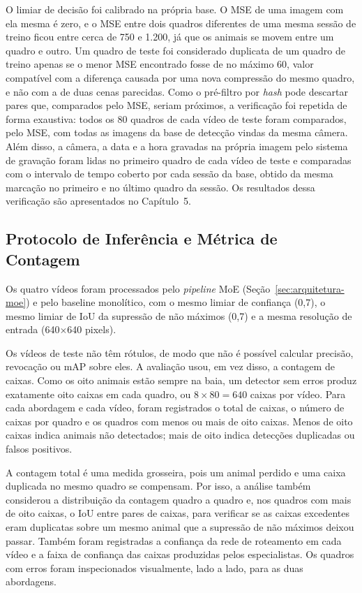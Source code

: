 O limiar de decisão foi calibrado na própria base. O MSE de uma imagem com ela mesma é zero, e o MSE entre dois quadros diferentes de uma mesma sessão de treino ficou entre cerca de 750 e 1.200, já que os animais se movem entre um quadro e outro. Um quadro de teste foi considerado duplicata de um quadro de treino apenas se o menor MSE encontrado fosse de no máximo 60, valor compatível com a diferença causada por uma nova compressão do mesmo quadro, e não com a de duas cenas parecidas. Como o pré-filtro por \textit{hash} pode descartar pares que, comparados pelo MSE, seriam próximos, a verificação foi repetida de forma exaustiva: todos os 80 quadros de cada vídeo de teste foram comparados, pelo MSE, com todas as imagens da base de detecção vindas da mesma câmera. Além disso, a câmera, a data e a hora gravadas na própria imagem pelo sistema de gravação foram lidas no primeiro quadro de cada vídeo de teste e comparadas com o intervalo de tempo coberto por cada sessão da base, obtido da mesma marcação no primeiro e no último quadro da sessão. Os resultados dessa verificação são apresentados no Capítulo~5.

\subsection{Protocolo de Inferência e Métrica de Contagem}
\label{subsec:metrica-contagem}

Os quatro vídeos foram processados pelo \textit{pipeline} MoE (Seção~\ref{sec:arquitetura-moe}) e pelo baseline monolítico, com o mesmo limiar de confiança (0,7), o mesmo limiar de IoU da supressão de não máximos (0,7) e a mesma resolução de entrada (640$\times$640 pixels).

Os vídeos de teste não têm rótulos, de modo que não é possível calcular precisão, revocação ou mAP sobre eles. A avaliação usou, em vez disso, a contagem de caixas. Como os oito animais estão sempre na baia, um detector sem erros produz exatamente oito caixas em cada quadro, ou $8 \times 80 = 640$ caixas por vídeo. Para cada abordagem e cada vídeo, foram registrados o total de caixas, o número de caixas por quadro e os quadros com menos ou mais de oito caixas. Menos de oito caixas indica animais não detectados; mais de oito indica detecções duplicadas ou falsos positivos.

A contagem total é uma medida grosseira, pois um animal perdido e uma caixa duplicada no mesmo quadro se compensam. Por isso, a análise também considerou a distribuição da contagem quadro a quadro e, nos quadros com mais de oito caixas, o IoU entre pares de caixas, para verificar se as caixas excedentes eram duplicatas sobre um mesmo animal que a supressão de não máximos deixou passar. Também foram registradas a confiança da rede de roteamento em cada vídeo e a faixa de confiança das caixas produzidas pelos especialistas. Os quadros com erros foram inspecionados visualmente, lado a lado, para as duas abordagens.

